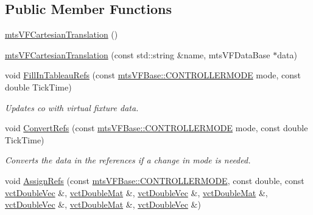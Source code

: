 \subsection*{Public Member Functions}
\begin{DoxyCompactItemize}
\item 
\hyperlink{classmts_v_f_cartesian_translation_a7d231a8919224a527952de0642ada8a3}{mts\+V\+F\+Cartesian\+Translation} ()
\item 
\hyperlink{classmts_v_f_cartesian_translation_a665414c1fa25cee96c3b4ce1d2896af2}{mts\+V\+F\+Cartesian\+Translation} (const std\+::string \&name, mts\+V\+F\+Data\+Base $\ast$data)
\item 
void \hyperlink{classmts_v_f_cartesian_translation_ad86d342b2fb779bb9cd6755c175bfeea}{Fill\+In\+Tableau\+Refs} (const \hyperlink{classmts_v_f_base_a742dd08f8b70bafeb746cec14d9ee974}{mts\+V\+F\+Base\+::\+C\+O\+N\+T\+R\+O\+L\+L\+E\+R\+M\+O\+D\+E} mode, const double Tick\+Time)
\begin{DoxyCompactList}\small\item\em Updates co with virtual fixture data. \end{DoxyCompactList}\item 
void \hyperlink{classmts_v_f_cartesian_translation_aaf1a2989af3387cc5355b3adaaae5fc2}{Convert\+Refs} (const \hyperlink{classmts_v_f_base_a742dd08f8b70bafeb746cec14d9ee974}{mts\+V\+F\+Base\+::\+C\+O\+N\+T\+R\+O\+L\+L\+E\+R\+M\+O\+D\+E} mode, const double Tick\+Time)
\begin{DoxyCompactList}\small\item\em Converts the data in the references if a change in mode is needed. \end{DoxyCompactList}\item 
void \hyperlink{classmts_v_f_cartesian_translation_abc87c7d13e2c60839e9a02e0e6b2742b}{Assign\+Refs} (const \hyperlink{classmts_v_f_base_a742dd08f8b70bafeb746cec14d9ee974}{mts\+V\+F\+Base\+::\+C\+O\+N\+T\+R\+O\+L\+L\+E\+R\+M\+O\+D\+E}, const double, const \hyperlink{vct_dynamic_vector_types_8h_ade4b3068c86fb88f41af2e5187e491c2}{vct\+Double\+Vec} \&, \hyperlink{vct_dynamic_matrix_types_8h_a48f1eb2461d20a99e824ee5753a37c84}{vct\+Double\+Mat} \&, \hyperlink{vct_dynamic_vector_types_8h_ade4b3068c86fb88f41af2e5187e491c2}{vct\+Double\+Vec} \&, \hyperlink{vct_dynamic_matrix_types_8h_a48f1eb2461d20a99e824ee5753a37c84}{vct\+Double\+Mat} \&, \hyperlink{vct_dynamic_vector_types_8h_ade4b3068c86fb88f41af2e5187e491c2}{vct\+Double\+Vec} \&, \hyperlink{vct_dynamic_matrix_types_8h_a48f1eb2461d20a99e824ee5753a37c84}{vct\+Double\+Mat} \&, \hyperlink{vct_dynamic_vector_types_8h_ade4b3068c86fb88f41af2e5187e491c2}{vct\+Double\+Vec} \&)
\end{DoxyCompactItemize}
